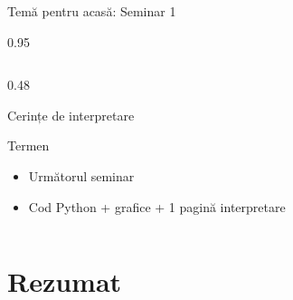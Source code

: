 \documentclass[9pt, aspectratio=169, t]{beamer}
\begin{document}
\begin{frame}[shrink=5]{Temă pentru acasă: Seminar 1}
\begin{cminipage}{0.95\textwidth}
\begin{columns}[T]
\begin{column}{0.48\textwidth}
\begin{block}{Cerințe de interpretare}
\begin{itemize}
    \end{itemize}
    \end{block}
    \vspace{0.05cm}
    \begin{alertblock}{Termen}
    \begin{itemize}\setlength{\itemsep}{0pt}
        \item Următorul seminar
        \item Cod Python + grafice + 1 pagină interpretare
    \end{itemize}
    \end{alertblock}
    \end{column}
    \end{columns}
    \end{cminipage}
\end{frame}

\section{Rezumat}
\end{document}
